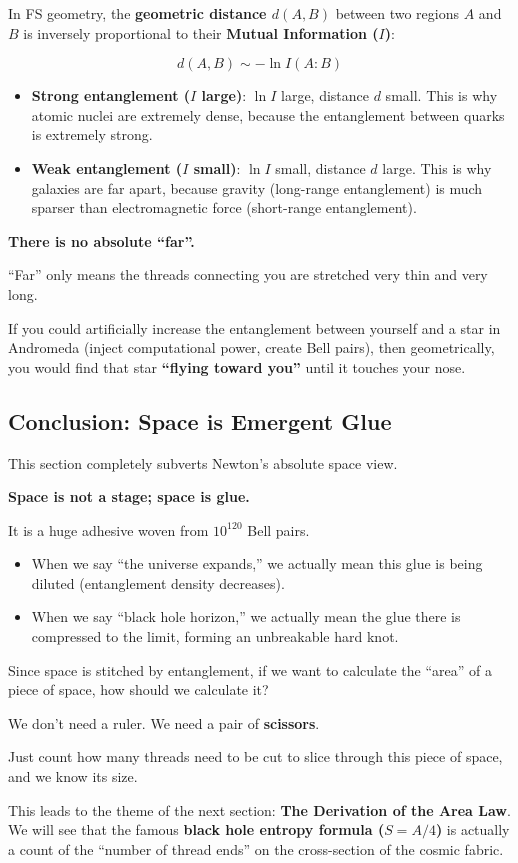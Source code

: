 In FS geometry, the \textbf{geometric distance $d(A, B)$} between two regions $A$ and $B$ is inversely proportional to their \textbf{Mutual Information ($I$)}:

\[d(A, B) \sim -\ln I(A : B)\]

\begin{itemize}
\item \textbf{Strong entanglement ($I$ large)}: $\ln I$ large, distance $d$ small. This is why atomic nuclei are extremely dense, because the entanglement between quarks is extremely strong.

\item \textbf{Weak entanglement ($I$ small)}: $\ln I$ small, distance $d$ large. This is why galaxies are far apart, because gravity (long-range entanglement) is much sparser than electromagnetic force (short-range entanglement).
\end{itemize}

\textbf{There is no absolute ``far''.}

``Far'' only means the threads connecting you are stretched very thin and very long.

If you could artificially increase the entanglement between yourself and a star in Andromeda (inject computational power, create Bell pairs), then geometrically, you would find that star \textbf{``flying toward you''} until it touches your nose.

\subsection{Conclusion: Space is Emergent Glue}

This section completely subverts Newton's absolute space view.

\textbf{Space is not a stage; space is glue.}

It is a huge adhesive woven from $10^{120}$ Bell pairs.

\begin{itemize}
\item When we say ``the universe expands,'' we actually mean this glue is being diluted (entanglement density decreases).

\item When we say ``black hole horizon,'' we actually mean the glue there is compressed to the limit, forming an unbreakable hard knot.
\end{itemize}

Since space is stitched by entanglement, if we want to calculate the ``area'' of a piece of space, how should we calculate it?

We don't need a ruler. We need a pair of \textbf{scissors}.

Just count how many threads need to be cut to slice through this piece of space, and we know its size.

This leads to the theme of the next section: \textbf{The Derivation of the Area Law}. We will see that the famous \textbf{black hole entropy formula ($S=A/4$)} is actually a count of the ``number of thread ends'' on the cross-section of the cosmic fabric.

